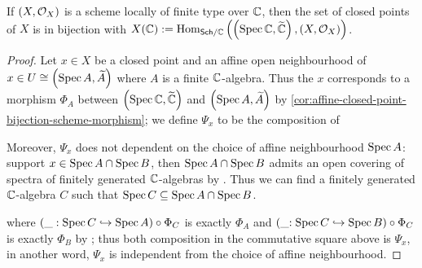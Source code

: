 \begin{proposition}
  If $\left(X, \mathcal{O}_{X}\right)$ is a scheme locally of finite type over $\mathbb{C}$, then the set of closed points of $X$ is in bijection with $X(\mathbb{C}) := \operatorname{Hom}_{\mathsf{Sch}/\mathbb{C}}\left(\left(\operatorname*{Spec}{\mathbb{C}}, \widetilde{\mathbb{C}}\right), \left(X, \mathcal{O}_{X}\right)\right)$.
\end{proposition}

\begin{proof}
  Let $x \in X$ be a closed point and an affine open neighbourhood of $x \in U \cong \left(\operatorname*{Spec}{A}, \widetilde{A}\right)$ where $A$ is a finite $\mathbb{C}$-algebra. Thus the $x$ corresponds to a morphism $\Phi_{A}$ between $\left(\operatorname*{Spec}{\mathbb{C}}, \widetilde{\mathbb{C}}\right)$ and $\left(\operatorname*{Spec}{A}, \widetilde{A}\right)$ by \cref{cor:affine-closed-point-bijection-scheme-morphism}; we define $\Psi_{x}$ to be the composition of
  \begin{center}
  \end{center}
  Moreover, $\Psi_{x}$ does not dependent on the choice of affine neighbourhood $\operatorname{Spec} A$: support $x \in \operatorname{Spec} A \cap \operatorname{Spec} B$, then $\operatorname{Spec} A \cap \operatorname{Spec} B$ admits an open covering of spectra of finitely generated $\mathbb{C}$-algebras by . Thus we can find a finitely generated $\mathbb{C}$-algebra $C$ such that $\operatorname{Spec} C \subseteq \operatorname{Spec} A \cap \operatorname{Spec} B$.
  \begin{center}
  \end{center}
  where $ (\_: \operatorname{Spec} C \hookrightarrow \operatorname{Spec} A) \circ \Phi_{C}$ is exactly $\Phi_{A}$ and $(\_{: \operatorname{Spec} C \hookrightarrow \operatorname{Spec} B}) \circ \Phi_{C}$ is exactly $\Phi_{B}$ by ; thus both composition in the commutative square above is $\Psi_{x}$, in another word, $\Psi_{x}$ is independent from the choice of affine neighbourhood.


\end{proof}

